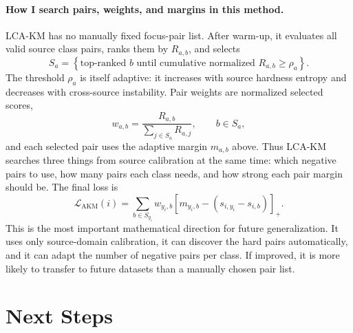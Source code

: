 \documentclass[11pt]{article}
\newcommand{\loss}{\mathcal{L}}
\begin{document}
\paragraph{How I search pairs, weights, and margins in this method.}
LCA-KM has no manually fixed focus-pair list. After warm-up, it evaluates all valid source class pairs, ranks them by $R_{a,b}$, and selects
\[
S_a
=
\left\{
\text{top-ranked } b
\text{ until cumulative normalized } R_{a,b} \ge \rho_a
\right\}.
\]
The threshold $\rho_a$ is itself adaptive: it increases with source hardness entropy and decreases with cross-source instability. Pair weights are normalized selected scores,
\[
w_{a,b}
=
\frac{R_{a,b}}{\sum_{j\in S_a}R_{a,j}},
\qquad b\in S_a,
\]
and each selected pair uses the adaptive margin $m_{a,b}$ above. Thus LCA-KM searches three things from source calibration at the same time: which negative pairs to use, how many pairs each class needs, and how strong each pair margin should be. The final loss is
\[
\loss_{\mathrm{AKM}}(i)
=
\sum_{b\in S_{y_i}}
w_{y_i,b}
\left[
m_{y_i,b}
-
(s_{i,y_i}-s_{i,b})
\right]_+.
\]
This is the most important mathematical direction for future generalization. It uses only source-domain calibration, it can discover the hard pairs automatically, and it can adapt the number of negative pairs per class. If improved, it is more likely to transfer to future datasets than a manually chosen pair list.

\section{Next Steps}
\end{document}
